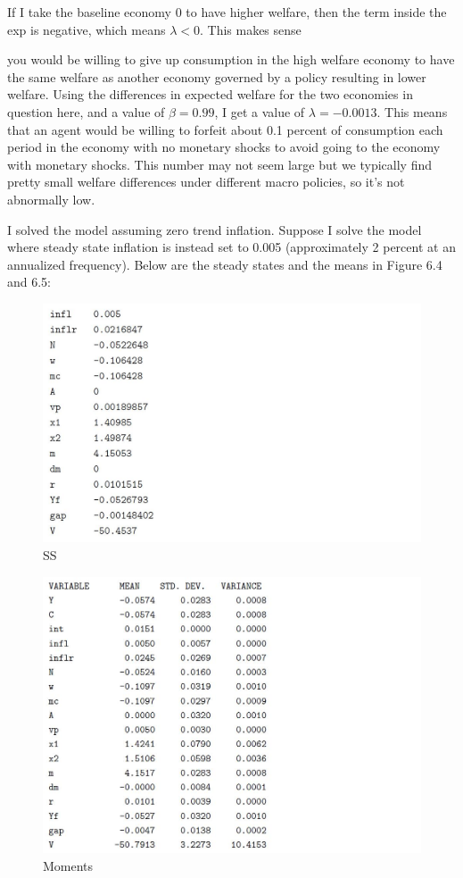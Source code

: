 \documentclass[cn,10pt,math=newtx,citestyle=gb7714-2015,bibstyle=gb7714-2015]{elegantbook}
\begin{document}
	If I take the baseline economy 0 to have higher welfare, then the term inside the exp is negative, which means $\lambda< 0$. This makes sense { you would be willing to give up consumption in the high welfare economy to have the same welfare as another economy governed by a policy resulting in lower welfare. Using the differences in expected welfare for the two economies in question here, and a value of $\beta = 0.99$, I get a value of $\lambda = -0.0013$. This means that an agent would be willing
		to forfeit about 0.1 percent of consumption each period in the economy with no monetary shocks to avoid going to the economy with monetary shocks. This number may not seem large but we
		typically find pretty small welfare differences under different macro policies, so it's not abnormally low.
		
		I solved the model assuming zero trend inflation. Suppose I solve the model where steady state inflation is instead set to 0.005 (approximately 2 percent at an annualized frequency). Below are the steady states and the means in Figure 6.4 and 6.5:
		
		\begin{figure}[htbp!]
			\centering
			\includegraphics[width=0.8\linewidth]{FIG/SS1}
			\caption{SS}\label{6.4}
			\centering
		\end{figure}
		
		\begin{figure}[htbp!]
			\centering
			\includegraphics[width=0.8\linewidth]{FIG/moment1}
			\caption{Moments}\label{6.5}
			\centering
		\end{figure}
		
}
\end{document}
